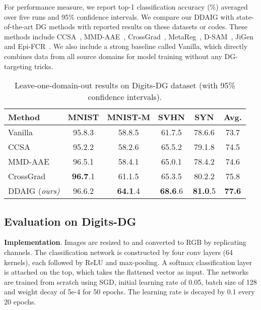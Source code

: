 \documentclass[letterpaper]{article}
\newcommand{\keypoint}[1]{\vspace{0.1cm}\noindent\textbf{#1}}
\newcommand{\tableCellHeight}{1.1}
\begin{document}
For performance measure, we report top-1 classification accuracy (\%) averaged over five runs and 95\% confidence intervals. We compare our DDAIG with state-of-the-art DG methods with reported results on these datasets or codes. These methods include CCSA~\cite{motiian2017unified}, MMD-AAE~\cite{li2018mmdaae}, CrossGrad~\cite{shankar2018generalizing}, MetaReg~\cite{balaji2018metareg}, D-SAM~\cite{d2018domain}, JiGen~\cite{cvpr19JiGen} and Epi-FCR~\cite{li2019episodic}. We also include a strong baseline called Vanilla, which directly combines data from all source domains for model training without any DG-targeting tricks.


\begin{table}[t]
\setlength{\tabcolsep}{3pt}
\renewcommand{\arraystretch}{\tableCellHeight}
\centering
\footnotesize
\caption{Leave-one-domain-out results on Digits-DG dataset (with 95\% confidence intervals).}
\label{tab:resOnDigitsDG}
\begin{tabular}{l | c c c c | c}
\hline
Method & MNIST & MNIST-M & SVHN & SYN & Avg. \\ \hline
Vanilla & 95.8.3 & 58.8.5 & 61.7.5 & 78.6.6 & 73.7 \\
CCSA & 95.2.2 & 58.2.6 & {65.5}.2 & 79.1.8 & 74.5 \\
MMD-AAE & 96.5.1 & 58.4.1 & 65.0.1 & 78.4.2 & 74.6 \\
CrossGrad & \textbf{96.7}.1 & {61.1}.5 & 65.3.5 & {80.2}.2 & {75.8} \\
DDAIG (\emph{ours)} & {96.6}.2 & \textbf{64.1}.4 & \textbf{68.6}.6 & \textbf{81.0}.5 & \textbf{77.6} \\
\hline
\end{tabular}
\vspace{-0.3cm}
\end{table}


\subsection{Evaluation on Digits-DG}
\keypoint{Implementation}.
Images are resized to  and converted to RGB by replicating channels.
The classification network is constructed by four  conv layers (64 kernels), each followed by ReLU and  max-pooling. A softmax classification layer is attached on the top, which takes the flattened vector as input.
The networks are trained from scratch using SGD, initial learning rate of 0.05, batch size of 128 and weight decay of 5e-4 for 50 epochs. The learning rate is decayed by 0.1 every 20 epochs.
\end{document}
